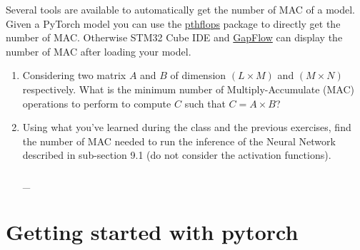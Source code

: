 \documentclass[parskip=half,notes,cadrem,toolver]{iisvlsi}
\begin{document}
Several tools are available to automatically get the number of MAC of a model. Given a PyTorch model you can use the  \href{https://pypi.org/project/pthflops/}{pthflops} package to directly get the number of MAC. Otherwise STM32 Cube IDE and \href{https://greenwaves-technologies.com/automated-design-intelligence-with-gapflow-overview-and-benchmarks-on-gap8/}{GapFlow} can display the number of MAC after loading your model. 



\begin{studtask}\label{tsk:mac}
    \begin{enumerate}
        \item Considering two matrix $A$ and $B$ of dimension $(L \times M)$ and $(M \times N)$ respectively. What is the minimum number of Multiply-Accumulate (MAC) operations to perform to compute $C$ such that $C = A \times B$? \answerrule
        \item Using what you've learned during the class and the previous exercises, find the number of MAC needed to run the inference of the Neural Network described in sub-section 9.1 (do not consider the activation functions).  \answerrule\\ \\ \_\answerrule
    \end{enumerate}
\end{studtask}


\section{Getting started with pytorch}
\end{document}
